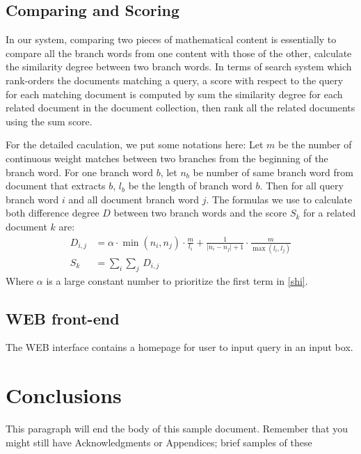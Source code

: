 \documentclass{acm_proc_article-sp}
\begin{document}
\subsection{Comparing and Scoring}
In our system, comparing two pieces of mathematical content is essentially to compare all the branch words from one content with those of the other, calculate the similarity degree between two branch words. In terms of search system which rank-orders the documents matching a query, a score with respect to the query for each matching document is computed by sum the similarity degree for each related document in the document collection, then rank all the related documents using the sum score.

For the detailed caculation, we put some notations here: Let $m$ be the number of continuous weight matches between two branches from the beginning of the branch word. For one branch word $b$, let $n_b$ be number of same branch word from document that extracts $b$, $l_b$ be the length of branch word $b$. Then for all query branch word $i$ and all document branch word $j$. The formulas we use to calculate both difference degree $D$ between two branch words and the score $S_k$ for a related document $k$ are:
\begin{align}
\label{shi}
D_{i,j} &= \alpha \cdot \min(n_i, n_j) \cdot \frac{m}{l_i} + \frac{1}{\lvert n_i - n_j \rvert + 1} \cdot \frac{m}{\max(l_i, l_j)} \\
S_k &= \sum_{i}\sum_{j}\,D_{i,j}
\end{align}
Where $\alpha$ is a large constant number to prioritize the first term in \eqref{shi}.

\subsection{WEB front-end}
The WEB interface contains a homepage for user to input query in an input box.
\section{Conclusions}
This paragraph will end the body of this sample document.
Remember that you might still have Acknowledgments or
Appendices; brief samples of these


\end{document}
